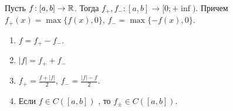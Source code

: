 \begin{definition}
    Пусть $f\!: [a, b] \to \mathbb{R}$. Тогда  $f_+, f_-\!: [a, b] \to [0; +\inf)$. Причем  $f_+(x) = \max\{f(x), 0\}$,  $f_- = \max\{-f(x), 0\}$.
\end{definition}
\begin{properties}
    \begin{enumerate}
        \item $f = f_+ - f_-$.
        \item  $|f| = f_+ + f_-$
        \item  $f_+ = \frac{f + |f|}{2}$, $f_- = \frac{|f| - f}{2}$.
        \item Если $f \in C([a, b])$ , то  $f_{\pm} \in C([a, b])$.
    \end{enumerate}
\end{properties}


